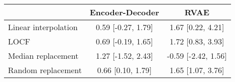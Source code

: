 \begin{tabular}{@{}lcc@{}}
\toprule
                   & Encoder-Decoder    & RVAE                \\ \midrule
Linear interpolation & 0.59 [-0.27, 1.79] & 1.67 [0.22, 4.21]   \\
LOCF                 & 0.69 [-0.19, 1.65] & 1.72 [0.83, 3.93]   \\
Median replacement   & 1.27 [-1.52, 2.43] & -0.59 [-2.42, 1.56] \\
Random replacement   & 0.66 [0.10, 1.79]  & 1.65 [1.07, 3.76]   \\ \bottomrule
\end{tabular}